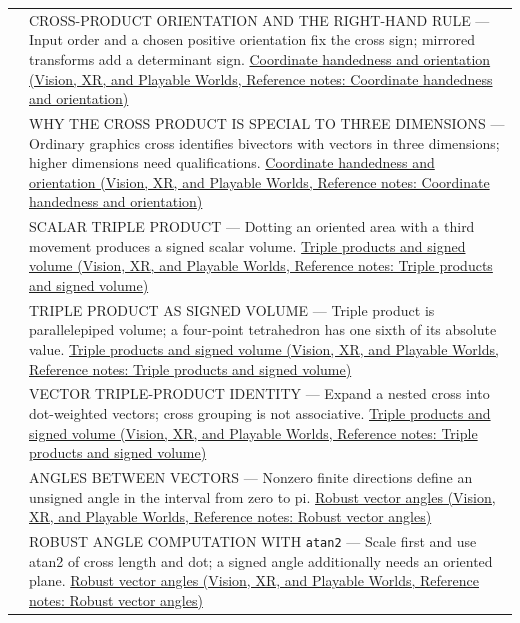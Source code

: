 {\begin{longtable}[]{@{}
  >{\raggedright\arraybackslash}p{}
  >{\raggedright\arraybackslash}p{}@{}}
546 & CROSS-PRODUCT ORIENTATION AND THE RIGHT-HAND RULE --- Input order and a chosen positive orientation fix the cross sign; mirrored transforms add a determinant sign. \href{../07-Vision-XR-and-Playable-Worlds/main.pdf\#nameddest=appendix-87d7626c8d37}{Coordinate handedness and orientation (Vision, XR, and Playable Worlds, Reference notes: Coordinate handedness and orientation)} \\
547 & WHY THE CROSS PRODUCT IS SPECIAL TO THREE DIMENSIONS --- Ordinary graphics cross identifies bivectors with vectors in three dimensions; higher dimensions need qualifications. \href{../07-Vision-XR-and-Playable-Worlds/main.pdf\#nameddest=appendix-87d7626c8d37}{Coordinate handedness and orientation (Vision, XR, and Playable Worlds, Reference notes: Coordinate handedness and orientation)} \\
548 & SCALAR TRIPLE PRODUCT --- Dotting an oriented area with a third movement produces a signed scalar volume. \href{../07-Vision-XR-and-Playable-Worlds/main.pdf\#nameddest=appendix-5caa058bd9c7}{Triple products and signed volume (Vision, XR, and Playable Worlds, Reference notes: Triple products and signed volume)} \\
549 & TRIPLE PRODUCT AS SIGNED VOLUME --- Triple product is parallelepiped volume; a four-point tetrahedron has one sixth of its absolute value. \href{../07-Vision-XR-and-Playable-Worlds/main.pdf\#nameddest=appendix-5caa058bd9c7}{Triple products and signed volume (Vision, XR, and Playable Worlds, Reference notes: Triple products and signed volume)} \\
550 & VECTOR TRIPLE-PRODUCT IDENTITY --- Expand a nested cross into dot-weighted vectors; cross grouping is not associative. \href{../07-Vision-XR-and-Playable-Worlds/main.pdf\#nameddest=appendix-5caa058bd9c7}{Triple products and signed volume (Vision, XR, and Playable Worlds, Reference notes: Triple products and signed volume)} \\
551 & ANGLES BETWEEN VECTORS --- Nonzero finite directions define an unsigned angle in the interval from zero to pi. \href{../07-Vision-XR-and-Playable-Worlds/main.pdf\#nameddest=appendix-e569e60e18e6}{Robust vector angles (Vision, XR, and Playable Worlds, Reference notes: Robust vector angles)} \\
552 & ROBUST ANGLE COMPUTATION WITH \texttt{atan2} --- Scale first and use atan2 of cross length and dot; a signed angle additionally needs an oriented plane. \href{../07-Vision-XR-and-Playable-Worlds/main.pdf\#nameddest=appendix-e569e60e18e6}{Robust vector angles (Vision, XR, and Playable Worlds, Reference notes: Robust vector angles)} \\

\end{longtable}}
